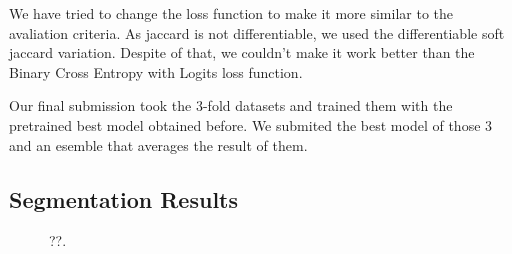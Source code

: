 \documentclass[conference]{IEEEtran}
\begin{document}
We have tried to change the loss function to make it more similar to the avaliation criteria. As jaccard is not differentiable, we used the differentiable soft jaccard variation\cite{iglovikov}. Despite of that, we couldn't make it work better than the Binary Cross Entropy with Logits loss function. 

Our final submission took the 3-fold datasets and trained them with the pretrained best model obtained before. We submited the best model of those 3 and an esemble that averages the result of them. 

\subsection{Segmentation Results}

\begin{figure}
\centering
{}\hfil
{}
\caption{??.}\label{result_samples}
\end{figure}
\end{document}
